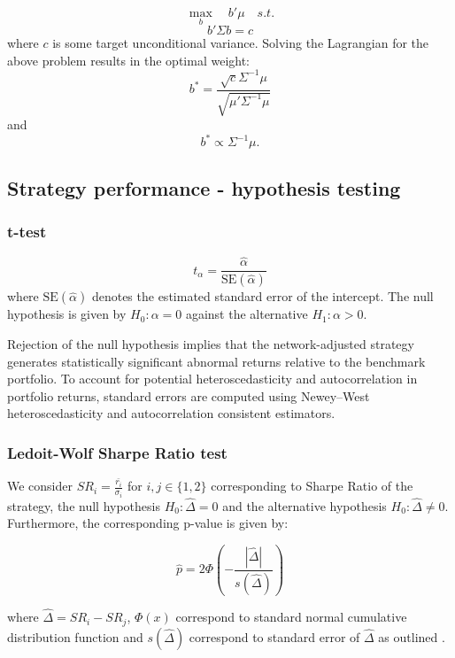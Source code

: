 \documentclass[11pt]{article}
\begin{document}
\begin{equation}
    \max_{b} \quad b'\mu \quad s.t.
\end{equation}
\begin{equation}
    b'\Sigma b = c
\end{equation}
where $c$ is some target unconditional variance. 
Solving the Lagrangian for the above problem results in the optimal weight:
\begin{equation}
    b^{*} = \frac{\sqrt{c}\Sigma^{-1}\mu}{\sqrt{\mu'\Sigma^{-1}\mu}}
\end{equation}
and 
\begin{equation}
    b^{*} \propto \Sigma^{-1}\mu.
\end{equation}



\subsection{Strategy performance - hypothesis testing}
\label{app:performance_tests}

\subsubsection{t-test}
\label{app:performance_tests_t_test}
\begin{equation}
t_{\alpha} =
\frac{\hat{\alpha}}
{\text{SE}(\hat{\alpha})}
\end{equation}
where $\text{SE}(\hat{\alpha})$ denotes the estimated standard error of the intercept. The null hypothesis is given by $H_0 : \alpha = 0$ against the alternative $H_1 : \alpha > 0.$ 

Rejection of the null hypothesis implies that the network-adjusted strategy generates statistically significant abnormal returns relative to the benchmark portfolio. To account for potential heteroscedasticity and autocorrelation in portfolio returns, standard errors are computed using Newey--West heteroscedasticity and autocorrelation consistent estimators. \\

\subsubsection{Ledoit-Wolf Sharpe Ratio test}
\label{app:performance_tests_Sharpe_ratio}


We consider $ SR_{i} = \frac{\bar{r_{i}}}{\sigma_{i}}$ 
for $i, j \in \{1,2\}$  corresponding to Sharpe Ratio of the strategy, the null hypothesis $H_{0}:\hat{\Delta} = 0 $ and the alternative hypothesis $H_{0}:\hat{\Delta} \neq 0 $. 
Furthermore, the corresponding p-value is given by:

\begin{equation}
    \hat p = 2 \Phi\left ( - \frac{|\hat{\Delta}|}{s(\hat{\Delta})}\right)
\end{equation}

where $\hat{\Delta} = SR_{i}-SR_{j}$, $\Phi(x)$ correspond to standard normal cumulative distribution function and $s(\hat{\Delta})$ correspond to standard error of $\hat{\Delta}$ as outlined \cite{LedoitWolf2008Sharpe}. 
\end{document}
